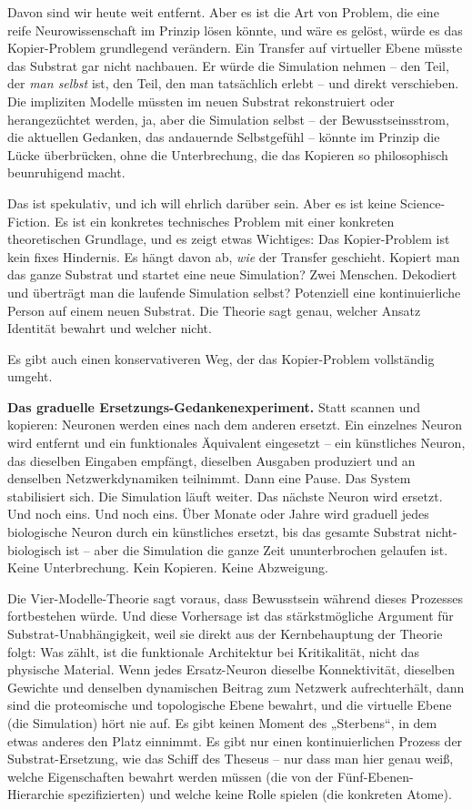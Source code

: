 \documentclass[11pt, twoside, openright]{book}
\begin{document}
Davon sind wir heute weit entfernt. Aber es ist die Art von Problem, die eine reife Neurowissenschaft im Prinzip lösen könnte, und wäre es gelöst, würde es das Kopier-Problem grundlegend verändern. Ein Transfer auf virtueller Ebene müsste das Substrat gar nicht nachbauen. Er würde die Simulation nehmen -- den Teil, der \textit{man selbst} ist, den Teil, den man tatsächlich erlebt -- und direkt verschieben. Die impliziten Modelle müssten im neuen Substrat rekonstruiert oder herangezüchtet werden, ja, aber die Simulation selbst -- der Bewusstseinsstrom, die aktuellen Gedanken, das andauernde Selbstgefühl -- könnte im Prinzip die Lücke überbrücken, ohne die Unterbrechung, die das Kopieren so philosophisch beunruhigend macht.

Das ist spekulativ, und ich will ehrlich darüber sein. Aber es ist keine Science-Fiction. Es ist ein konkretes technisches Problem mit einer konkreten theoretischen Grundlage, und es zeigt etwas Wichtiges: Das Kopier-Problem ist kein fixes Hindernis. Es hängt davon ab, \textit{wie} der Transfer geschieht. Kopiert man das ganze Substrat und startet eine neue Simulation? Zwei Menschen. Dekodiert und überträgt man die laufende Simulation selbst? Potenziell eine kontinuierliche Person auf einem neuen Substrat. Die Theorie sagt genau, welcher Ansatz Identität bewahrt und welcher nicht.

Es gibt auch einen konservativeren Weg, der das Kopier-Problem vollständig umgeht.

\textbf{Das graduelle Ersetzungs-Gedankenexperiment.} Statt scannen und kopieren: Neuronen werden eines nach dem anderen ersetzt. Ein einzelnes Neuron wird entfernt und ein funktionales Äquivalent eingesetzt -- ein künstliches Neuron, das dieselben Eingaben empfängt, dieselben Ausgaben produziert und an denselben Netzwerkdynamiken teilnimmt. Dann eine Pause. Das System stabilisiert sich. Die Simulation läuft weiter. Das nächste Neuron wird ersetzt. Und noch eins. Und noch eins. Über Monate oder Jahre wird graduell jedes biologische Neuron durch ein künstliches ersetzt, bis das gesamte Substrat nicht-biologisch ist -- aber die Simulation die ganze Zeit ununterbrochen gelaufen ist. Keine Unterbrechung. Kein Kopieren. Keine Abzweigung.

Die Vier-Modelle-Theorie sagt voraus, dass Bewusstsein während dieses Prozesses fortbestehen würde. Und diese Vorhersage ist das stärkstmögliche Argument für Substrat-Unabhängigkeit, weil sie direkt aus der Kernbehauptung der Theorie folgt: Was zählt, ist die funktionale Architektur bei Kritikalität, nicht das physische Material. Wenn jedes Ersatz-Neuron dieselbe Konnektivität, dieselben Gewichte und denselben dynamischen Beitrag zum Netzwerk aufrechterhält, dann sind die proteomische und topologische Ebene bewahrt, und die virtuelle Ebene (die Simulation) hört nie auf. Es gibt keinen Moment des „Sterbens“, in dem etwas anderes den Platz einnimmt. Es gibt nur einen kontinuierlichen Prozess der Substrat-Ersetzung, wie das Schiff des Theseus -- nur dass man hier genau weiß, welche Eigenschaften bewahrt werden müssen (die von der Fünf-Ebenen-Hierarchie spezifizierten) und welche keine Rolle spielen (die konkreten Atome).
\end{document}
